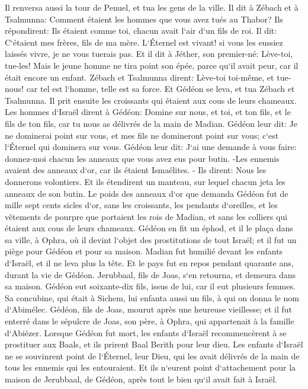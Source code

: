 \verse Il renversa aussi la tour de Penuel, et tua les gens de la ville. 
\verse Il dit à Zébach et à Tsalmunna: Comment étaient les hommes que vous avez tués au Thabor? Ils répondirent: Ils étaient comme toi, chacun avait l`air d`un fils de roi. 
\verse Il dit: C`étaient mes frères, fils de ma mère. L`Éternel est vivant! si vous les eussiez laissés vivre, je ne vous tuerais pas. 
\verse Et il dit à Jéther, son premier-né: Lève-toi, tue-les! Mais le jeune homme ne tira point son épée, parce qu`il avait peur, car il était encore un enfant. 
\verse Zébach et Tsalmunna dirent: Lève-toi toi-même, et tue-nous! car tel est l`homme, telle est sa force. Et Gédéon se leva, et tua Zébach et Tsalmunna. Il prit ensuite les croissants qui étaient aux cous de leurs chameaux. 
\verse Les hommes d`Israël dirent à Gédéon: Domine sur nous, et toi, et ton fils, et le fils de ton fils, car tu nous as délivrés de la main de Madian. 
\verse Gédéon leur dit: Je ne dominerai point sur vous, et mes fils ne domineront point sur vous; c`est l`Éternel qui dominera sur vous. 
\verse Gédéon leur dit: J`ai une demande à vous faire: donnez-moi chacun les anneaux que vous avez eus pour butin. -Les ennemis avaient des anneaux d`or, car ils étaient Ismaélites. - 
\verse Ils dirent: Nous les donnerons volontiers. Et ils étendirent un manteau, sur lequel chacun jeta les anneaux de son butin. 
\verse Le poids des anneaux d`or que demanda Gédéon fut de mille sept cents sicles d`or, sans les croissants, les pendants d`oreilles, et les vêtements de pourpre que portaient les rois de Madian, et sans les colliers qui étaient aux cous de leurs chameaux. 
\verse Gédéon en fit un éphod, et il le plaça dans sa ville, à Ophra, où il devint l`objet des prostitutions de tout Israël; et il fut un piège pour Gédéon et pour sa maison. 
\verse Madian fut humilié devant les enfants d`Israël, et il ne leva plus la tête. Et le pays fut en repos pendant quarante ans, durant la vie de Gédéon. 
\verse Jerubbaal, fils de Joas, s`en retourna, et demeura dans sa maison. 
\verse Gédéon eut soixante-dix fils, issus de lui, car il eut plusieurs femmes. 
\verse Sa concubine, qui était à Sichem, lui enfanta aussi un fils, à qui on donna le nom d`Abimélec. 
\verse Gédéon, fils de Joas, mourut après une heureuse vieillesse; et il fut enterré dans le sépulcre de Joas, son père, à Ophra, qui appartenait à la famille d`Abiézer. 
\verse Lorsque Gédéon fut mort, les enfants d`Israël recommencèrent à se prostituer aux Baals, et ils prirent Baal Berith pour leur dieu. 
\verse Les enfants d`Israël ne se souvinrent point de l`Éternel, leur Dieu, qui les avait délivrés de la main de tous les ennemis qui les entouraient. 
\verse Et ils n`eurent point d`attachement pour la maison de Jerubbaal, de Gédéon, après tout le bien qu`il avait fait à Israël. 

